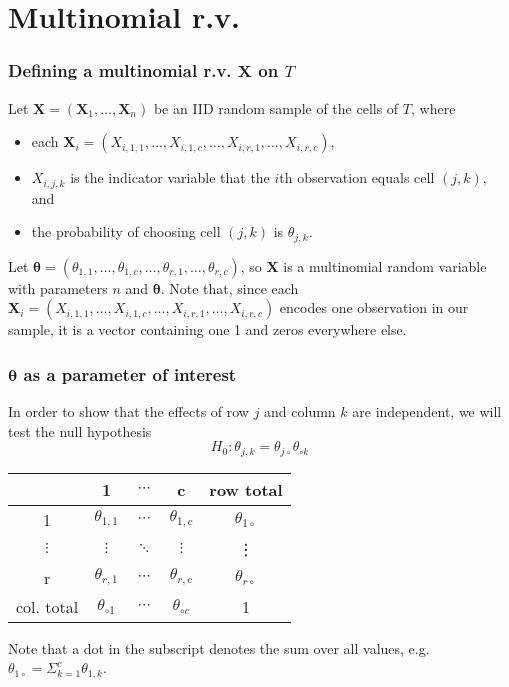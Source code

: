 \documentclass{beamer}
\begin{document}
\section{Multinomial r.v.}
\begin{frame}
\frametitle{Defining a multinomial r.v. $\textbf{X}$ on $T$}
Let $\textbf{X} = (\textbf{X}_1, \ldots, \textbf{X}_n)$ be an IID random sample of the cells of $T$, where \\
\begin{itemize}
	\item each $\textbf{X}_i = (X_{i,1,1}, \ldots, X_{i,1,c}, \ldots, X_{i,r,1}, \ldots, X_{i,r,c})$,
	\item $X_{i,j,k}$ is the indicator variable that the $i$th observation equals cell $(j,k)$, and
	\item the probability of choosing cell $(j, k)$ is $\theta_{j,k}$.
\end{itemize}
\vskip0.1in
Let $\boldsymbol\theta = (\theta_{1,1}, \ldots, \theta_{1,c}, \ldots, \theta_{r,1}, \ldots, \theta_{r,c})$, so $\textbf{X}$ is a multinomial random variable with parameters $n$ and $\boldsymbol{\theta}$.
\vskip0.1in
Note that, since each $\textbf{X}_i=(X_{i,1,1}, \ldots, X_{i,1,c}, \ldots, X_{i,r,1}, \ldots, X_{i,r,c})$ encodes one observation in our sample, it is a vector containing one 1 and zeros everywhere else.

\end{frame}

\begin{frame}
	\frametitle{$\boldsymbol{\theta}$ as a parameter of interest}
	In order to show that the effects of row $j$ and column $k$ are independent, we will test the null hypothesis 
	\[H_0:\theta_{j,k} = \theta_{j\circ}\theta_{\circ k}\]
	
	\begin{center}
		\begin{tabular}{ |c|c|c|c|c| } 
			\hline
			&1 & $\cdots$ & c&row total \\ 
			\hline
			1&$\theta_{1,1}$ &$\cdots$ & $\theta_{1,c}$&$\theta_{1\circ}$ \\ 
			\hline
			$\vdots$& $\vdots$& $\ddots$ & $\vdots$&\vdots \\ 
			\hline
			r&$\theta_{r,1}$ & $\cdots$ & $\theta_{r,c}$&$\theta_{r\circ}$ \\ 
			\hline
			col. total&$\theta_{\circ1}$ & $\cdots$ & $\theta_{\circ c}$&1 \\ 
			\hline
		\end{tabular}
	\end{center}
	Note that a dot in the subscript denotes the sum over all values, e.g. $\theta_{1\circ} = \Sigma_{k=1}^c\theta_{1,k}$.
	
\end{frame}
\end{document}

